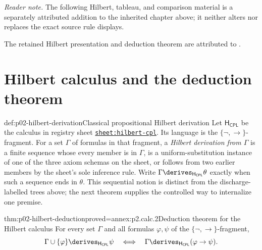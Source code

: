 \noindent\textit{Reader note.} The following Hilbert, tableau, and
comparison material is a separately attributed addition to the inherited
chapter above; it neither alters nor replaces the exact source rule displays.

The retained Hilbert presentation and deduction theorem are attributed to
\cite{Mendelson1997}.

\section{Hilbert calculus and the deduction theorem}
\label{sec:p02-hilbert-cpl}

\begin{hbdefinition}{def:p02-hilbert-derivation}{Classical propositional Hilbert derivation}
Let \(\mathsf H_{\mathsf{CPL}}\) be the calculus in registry sheet
\hyperref[sheet:hilbert-cpl]{\texttt{sheet:hilbert-cpl}}.  Its language is the
\(\{\neg,\to\}\)-fragment.  For a set \(\Gamma\) of formulas in that
fragment, a \emph{Hilbert derivation from \(\Gamma\)} is a finite sequence
whose every member is in \(\Gamma\), is a uniform-substitution instance of
one of the three axiom schemas on the sheet, or follows from two earlier
members by the sheet's sole inference rule.  Write
\(\Gamma\derives_{\mathsf H_{\mathsf{CPL}}}\theta\) exactly when such a
sequence ends in \(\theta\).  This sequential notion is distinct from the
discharge-labelled trees above; the next theorem supplies the controlled
way to internalize one premise.
\end{hbdefinition}

\begin{hbtheorem}{thm:p02-hilbert-deduction}{proved=annex:p2.calc.2}{Deduction theorem for the Hilbert calculus}
For every set \(\Gamma\) and all formulas \(\varphi,\psi\) of the
\(\{\neg,\to\}\)-fragment,
\[
 \Gamma\cup\{\varphi\}\derives_{\mathsf H_{\mathsf{CPL}}}\psi
 \quad\Longleftrightarrow\quad
 \Gamma\derives_{\mathsf H_{\mathsf{CPL}}}(\varphi\to\psi).
\]
\end{hbtheorem}

